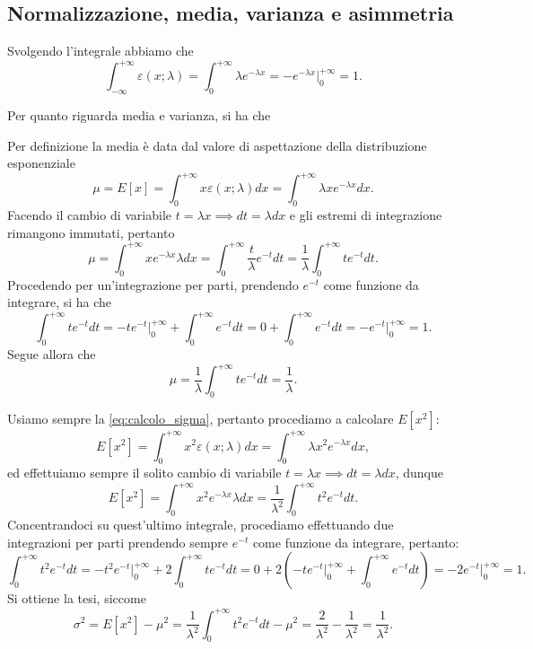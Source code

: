 \documentclass{report}
\begin{document}
\subsection{Normalizzazione, media, varianza e asimmetria}
\begin{myproof}
	Svolgendo l'integrale abbiamo che
	$$
	\int_{-\infty}^{+\infty} \varepsilon(x; \lambda) = \int_0^{+\infty} \lambda e^{-\lambda x} = - e^{-\lambda x}\bigg|^{+\infty}_{0} = 1.
	$$
\end{myproof}
Per quanto riguarda media e varianza, si ha che
\begin{myproof}
	Per definizione la media è data dal valore di aspettazione della distribuzione esponenziale
	$$
	\mu = E[x] = \int_0^{+\infty} x \varepsilon(x; \lambda)dx = \int_0^{+\infty} \lambda x e^{-\lambda x}dx.  
	$$
	Facendo il cambio di variabile $t = \lambda x \implies dt = \lambda dx$ e gli estremi di integrazione rimangono immutati, pertanto
	$$
	\mu = \int_0^{+\infty} x e^{-\lambda x} \lambda dx = \int_0^{+\infty} \frac{t}{\lambda} e^{-t} dt = \frac{1}{\lambda} \int_0^{+\infty} te^{-t}dt. 
	$$
	Procedendo per un'integrazione per parti, prendendo $e^{-t}$ come funzione da integrare, si ha che
	$$
		\int_0^{+\infty} te^{-t} dt = -te^{-t}\bigg|^{+\infty}_0 + \int_0^{+\infty} e^{-t}dt = 0 + \int_0^{+\infty} e^{-t}dt = -e^{-t}\bigg|^{+\infty}_0 = 1. 
	$$
	Segue allora che
	$$
		\mu = \frac{1}{\lambda} \int_0^{+\infty} te^{-t}dt = \frac{1}{\lambda}.
	$$
\end{myproof}
\begin{myproof}
	Usiamo sempre la \ref{eq:calcolo_sigma}, pertanto procediamo a calcolare $E[x^2]$:
	$$
		E[x^2] = \int_0^{+\infty} x^2 \varepsilon(x; \lambda)dx = \int_0^{+\infty} \lambda x^2 e^{-\lambda x}dx,
	$$
	ed effettuiamo sempre il solito cambio di variabile $t = \lambda x \implies dt = \lambda dx$, dunque
	$$
		E[x^2] = \int_0^{+\infty} x^2 e^{-\lambda x} \lambda dx = \frac{1}{\lambda^2} \int_0^{+\infty} t^2 e^{-t} dt.
	$$
	Concentrandoci su quest'ultimo integrale, procediamo effettuando due integrazioni per parti prendendo sempre $e^{-t}$ come funzione da integrare, pertanto:
	$$
	\int_0^{+\infty} t^2 e^{-t}dt = -t^2 e^{-t}\bigg|^{+\infty}_0 + 2\int^{+\infty}_0 te^{-t}dt = 0 + 2(-te^{-t}\bigg|^{+\infty}_0 + \int_0^{+\infty} e^{-t}dt) = - 2e^{-t}\bigg|^{+\infty}_0 = 1.
	$$
	Si ottiene la tesi, siccome
	$$
	\sigma^2 = E[x^2] - \mu^2 = \frac{1}{\lambda^2} \int_0^{+\infty} t^2 e^{-t}dt - \mu^2 = \frac{2}{\lambda^2} - \frac{1}{\lambda^2} = \frac{1}{\lambda^2}.
	$$
\end{myproof}
\end{document}
